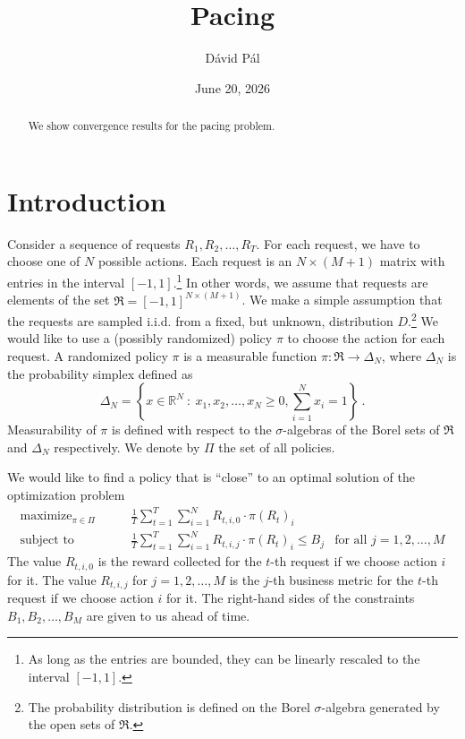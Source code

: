\documentclass[12pt]{article}
\newcommand{\R}{\mathbb{R}}
\newcommand{\Requests}{\mathfrak{R}}
\DeclareMathOperator*{\maximize}{maximize}
\DeclareMathOperator*{\subjectto}{subject\ to}
\theoremstyle{definition}
\begin{document}
\title{Pacing}
\author{D\'avid P\'al}
\date{June 20, 2026}

\maketitle

\begin{abstract}
We show convergence results for the pacing problem.
\end{abstract}

\section{Introduction}

Consider a sequence of requests $R_1, R_2, \dots, R_T$. For each request, we
have to choose one of $N$ possible actions. Each request is an $N \times (M+1)$
matrix with entries in the interval $[-1,1]$.\footnote{As long as the entries
are bounded, they can be linearly rescaled to the interval $[-1,1]$.} In other
words, we assume that requests are elements of the set $\Requests = [-1,1]^{N
\times (M+1)}$. We make a simple assumption that the requests are sampled i.i.d.
from a fixed, but unknown, distribution $D$.\footnote{The probability
distribution is defined on the Borel $\sigma$-algebra generated by the open sets
of $\Requests$.} We would like to use a (possibly randomized) policy $\pi$ to
choose the action for each request. A randomized policy $\pi$ is a measurable
function $\pi:\Requests \to \Delta_N$, where $\Delta_N$ is the probability
simplex defined as
$$
\Delta_N = \left\{ x \in \R^N ~:~ x_1, x_2, \dots, x_N \ge 0, \sum_{i=1}^N x_i = 1  \right\} \: .
$$
Measurability of $\pi$ is defined with respect to the $\sigma$-algebras of the
Borel sets of $\Requests$ and $\Delta_N$ respectively. We denote by $\Pi$ the
set of all policies.

We would like to find a policy that is ``close'' to an optimal solution
of the optimization problem
\begin{equation}
\label{equation:sample-policy-optimization}
\begin{aligned}
\maximize_{\pi \in \Pi} \qquad & \frac{1}{T} \sum_{t=1}^T \sum_{i=1}^N R_{t,i,0} \cdot \pi(R_t)_i \\
\subjectto \qquad & \frac{1}{T} \sum_{t=1}^T \sum_{i=1}^N R_{t,i,j} \cdot \pi(R_t)_i \le B_j & \text{for all $j=1,2,\dots,M$}
\end{aligned}
\end{equation}
The value $R_{t,i,0}$ is the reward collected for the $t$-th request if we choose
action $i$ for it. The value $R_{t,i,j}$ for $j = 1, 2, \dots, M$ is the
$j$-th business metric for the $t$-th request if we choose action $i$ for it.
The right-hand sides of the constraints $B_1, B_2, \dots, B_M$ are given to us
ahead of time.
\end{document}
